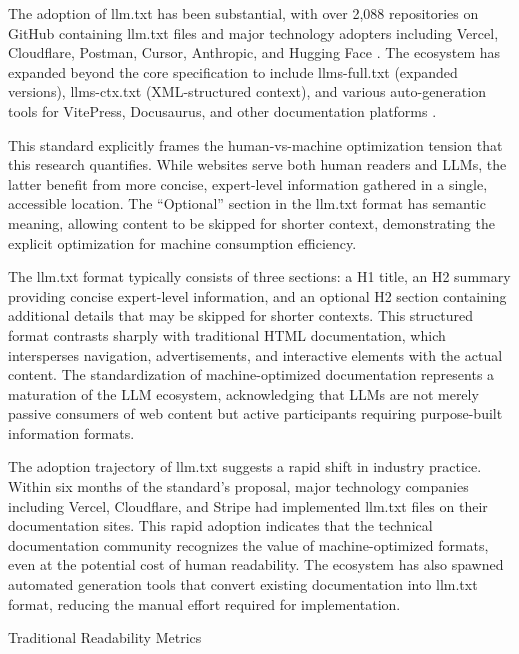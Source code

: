 \documentclass[10pt,conference,a4paper]{IEEEtran}
\makeatletter
\let\oldsubsection\subsection
\renewcommand{\subsection}{%
    \@ifstar{\subsectionStar}{\subsectionNoStar}%
}
\newcommand{\subsectionStar}[1]{%
    \oldsubsection*{\textit{#1}}%
    \vspace{-3pt}%
}
\newcommand{\subsectionNoStar}[1]{%
    \oldsubsection{\textit{#1}}%
    \vspace{-3pt}%
}
\makeatother
\begin{document}
The adoption of llm.txt has been substantial, with over 2,088 repositories on GitHub containing llm.txt files and major technology adopters including Vercel, Cloudflare, Postman, Cursor, Anthropic, and Hugging Face \cite{AnswerDotAI2024}. The ecosystem has expanded beyond the core specification to include llms-full.txt (expanded versions), llms-ctx.txt (XML-structured context), and various auto-generation tools for VitePress, Docusaurus, and other documentation platforms \cite{llmstxtSite,llmstxtDirectory}.

This standard explicitly frames the human-vs-machine optimization tension that this research quantifies. While websites serve both human readers and LLMs, the latter benefit from more concise, expert-level information gathered in a single, accessible location. The ``Optional'' section in the llm.txt format has semantic meaning, allowing content to be skipped for shorter context, demonstrating the explicit optimization for machine consumption efficiency.

The llm.txt format typically consists of three sections: a H1 title, an H2 summary providing concise expert-level information, and an optional H2 section containing additional details that may be skipped for shorter contexts. This structured format contrasts sharply with traditional HTML documentation, which intersperses navigation, advertisements, and interactive elements with the actual content. The standardization of machine-optimized documentation represents a maturation of the LLM ecosystem, acknowledging that LLMs are not merely passive consumers of web content but active participants requiring purpose-built information formats.

The adoption trajectory of llm.txt suggests a rapid shift in industry practice. Within six months of the standard's proposal, major technology companies including Vercel, Cloudflare, and Stripe had implemented llm.txt files on their documentation sites. This rapid adoption indicates that the technical documentation community recognizes the value of machine-optimized formats, even at the potential cost of human readability. The ecosystem has also spawned automated generation tools that convert existing documentation into llm.txt format, reducing the manual effort required for implementation.

\subsection{Traditional Readability Metrics}
\end{document}
